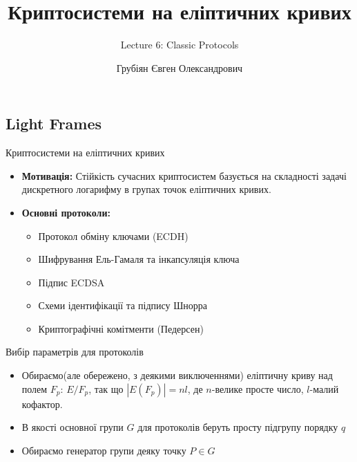 \documentclass[9pt]{beamer}
\title{Криптосистеми на еліптичних кривих} %
\subtitle{Lecture 6: Classic Protocols}
\author{Грубіян Євген Олександрович}
\begin{document}
  \frame{\maketitle}


  \begin{darkframes}
      
    \section{Light Frames}



\begin{frame}{Криптосистеми на еліптичних кривих}
  \begin{itemize}
    \item \textbf{Мотивація:} Стійкість сучасних криптосистем базується на складності задачі дискретного логарифму в групах точок еліптичних кривих.
    \item \textbf{Основні протоколи:}
      \begin{itemize}
        \item Протокол обміну ключами (ECDH)
        \item Шифрування Ель-Гамаля та інкапсуляція ключа
        \item Підпис ECDSA
        \item Схеми ідентифікації та підпису Шнорра
        \item Криптографічні комітменти (Педерсен)
      \end{itemize}
  \end{itemize}
  Вибір параметрів для протоколів
  \begin{itemize}
      \item Обираємо(але обережено, з деякими виключеннями) еліптичну криву над полем $F_p$: $E/F_p$, так що $|E(F_p)|=nl$, де $n$-велике просте число, $l$-малий кофактор. 
      \item В якості основної групи $G$ для протоколів беруть просту підгрупу порядку $q$
      \item Обираємо генератор групи деяку точку $P \in G$
  \end{itemize}
\end{frame}


\end{darkframes}
\end{document}
